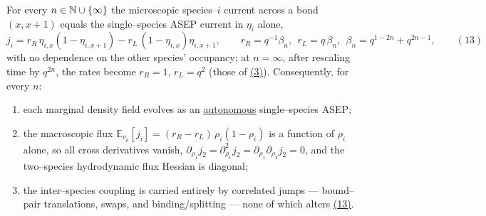 \documentclass[11pt]{article}
\theoremstyle{plain}
\theoremstyle{definition}
\theoremstyle{remark}
\newcommand{\E}{\mathbb{E}}\newcommand{\PP}{\mathbb{P}}\newcommand{\dd}{\,\mathrm{d}}
\begin{document}
For every $n\in\mathbb{N}\cup\{\infty\}$ the microscopic species--$i$ current across a bond
$(x,x{+}1)$ equals the single--species ASEP current in $\eta_i$ alone,
\label{eq_jdecouple}
\begin{equation}
  j_i=r_R\,\eta_{i,x}(1-\eta_{i,x+1})-r_L\,(1-\eta_{i,x})\eta_{i,x+1},
  \qquad r_R=q^{-1}\beta_n,\ \ r_L=q\,\beta_n,\ \ \beta_n=q^{1-2n}+q^{2n-1},\qquad(13)
\end{equation}
with no dependence on the other species' occupancy; at $n=\infty$, after rescaling time
by $q^{2n}$, the rates become $r_R=1$, $r_L=q^2$ (those of \hyperref[eq_rates]{(3)}).
Consequently, for every $n$:
\begin{enumerate}
\item[\textup{(a)}] each marginal density field evolves as an \underline{autonomous}
single--species ASEP;
\item[\textup{(b)}] the macroscopic flux $\E_{\nu_\rho}[j_i]=(r_R-r_L)\,\rho_i(1-\rho_i)$
is a function of $\rho_i$ alone, so all cross derivatives vanish,
$\partial_{\rho_1}j_2=\partial^2_{\rho_1}j_2=\partial_{\rho_1}\partial_{\rho_2}j_2=0$,
and the two--species hydrodynamic flux Hessian is diagonal;
\item[\textup{(c)}] the inter--species coupling is carried entirely by correlated
jumps --- bound--pair translations, swaps, and binding/splitting --- none of which
alters \hyperref[eq_jdecouple]{(13)}.
\end{enumerate}
\par
\end{document}
